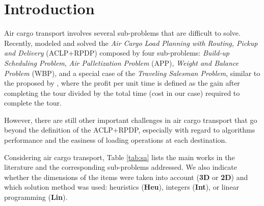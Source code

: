 \documentclass[preprint,authoryear]{elsarticle}
\begin{document}
\label{sec1}
\section{Introduction}


Air cargo transport involves several sub-problems that are difficult to solve. Recently, \cite{MesquitaSanches2023} modeled and solved the {\it Air Cargo Load Planning with Routing, Pickup and Delivery} (ACLP+RPDP) composed by four sub-problems: {\it Build-up Scheduling Problem}, {\it Air Palletization Problem} (APP), {\it Weight and Balance Problem} (WBP), and a special case of the {\it Traveling Salesman Problem}, similar to the proposed by \cite{kaspi2019}, where the profit per unit time is defined as the gain after completing the tour divided by the total time (cost in our case) required to complete the tour.

However, there are still other important challenges in air cargo transport that go beyond the definition of the ACLP+RPDP, especially with regard to algorithms performance and the easiness of loading operations at each destination.

Considering air cargo transport, Table \ref{tab:sa} lists the main works in the literature and the corresponding sub-problems addressed. We also indicate whether the dimensions of the items were taken into account ({\bf 3D} or {\bf 2D}) and which solution method was used: heuristics ({\bf Heu}), integers ({\bf Int}), or linear programming ({\bf Lin}).
\end{document}
